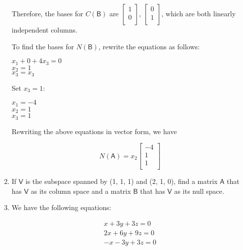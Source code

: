 \documentclass[a4paper, 11pt]{article}
\newcommand{\mat}[1]{\boldsymbol { \mathsf{#1}} }
\begin{document}
\begin{enumerate}
Therefore, the bases for $C(\mat{B})$ are $\begin{bmatrix}
1 \\
0 \\
\end{bmatrix}$, $\begin{bmatrix}
0 \\
1 \\
\end{bmatrix}$, which are both linearly independent columns.

To find the bases for $N(\mat{B})$, rewrite the equations as follows:
\begin{center}
    $x_1 + 0 + 4x_3 = 0$ \\
    $x_2 = 1$ \\
    $x_3 = x_3$ \\
\end{center}

Set $x_3 = 1$:

\begin{center}
    $x_1  = -4$ \\
    $x_2 = 1$ \\
    $x_3 = 1$ \\
\end{center}


Rewriting the above equations in vector form, we have

\begin{equation*}
    N(\mat{A}) = x_2 
    \begin{bmatrix}
    -4 \\
    1 \\
    1 \\
    \end{bmatrix}
\end{equation*}

\item If $\mat V$ is the subspace spanned by (1, 1, 1) and (2, 1, 0), find a matrix $\mat A$ that has $\mat V$ as its column space and a matrix $\mat B$ that has $\mat V$ as its null space.


\item We have the following equations:

\begin{equation} \label{eq1}
\begin{split}
x + 3y + 3z  = 0\\
2x + 6y + 9z = 0\\
-x - 3y +3z  = 0
\end{split}
\end{equation}


\end{enumerate}
\end{document}

